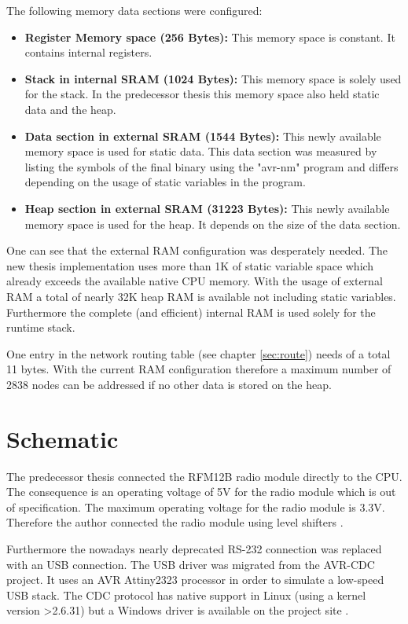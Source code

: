The following memory data sections were configured:

\begin{itemize}
    \item \textbf{Register Memory space (256 Bytes):} This memory space is constant. It contains internal registers.
    \item \textbf{Stack in internal SRAM (1024 Bytes):} This memory space is solely used for the stack. In the predecessor thesis \cite{korniowski} this memory space also held static data and the heap.
    \item \textbf{Data section in external SRAM (1544 Bytes):} This newly available memory space is used for static data. This data section was measured by listing the symbols of the final binary using the "avr-nm" program and differs depending on the usage of static variables in the program.
    \item \textbf{Heap section in external SRAM (31223 Bytes):} This newly available memory space is used for the heap. It depends on the size of the data section.
\end{itemize}

One can see that the external RAM configuration was desperately needed. The new thesis implementation uses more than 1K of static variable space which already exceeds the available native CPU memory. With the usage of external RAM a total of nearly 32K heap RAM is available not including static variables. Furthermore the complete (and efficient) internal RAM is used solely for the runtime stack.

One entry in the network routing table (see chapter \ref{sec:route}) needs of a total 11 bytes. With the current RAM configuration therefore a maximum number of 2838 nodes can be addressed if no other data is stored on the heap.

\section{Schematic}%
The predecessor thesis \cite{korniowski} connected the RFM12B radio module directly to the CPU. The consequence is an operating voltage of 5V for the radio module which is out of specification. The maximum operating voltage for the radio module is 3.3V. Therefore the author connected the radio module using level shifters \cite{schutte}.

Furthermore the nowadays nearly deprecated RS-232 connection was replaced with an USB connection. The USB driver was migrated from the AVR-CDC \cite{avrcdc} project. It uses an AVR Attiny2323 processor in order to simulate a low-speed USB stack. The CDC protocol has native support in Linux (using a kernel version >2.6.31) but a Windows driver is available on the project site \cite{avrcdc}.

